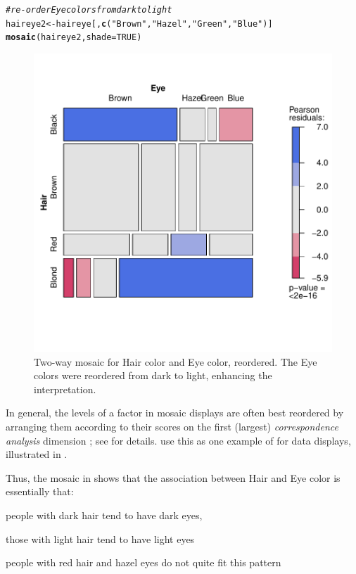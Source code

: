 \documentclass[11pt]{book}\usepackage[]{graphicx}\usepackage[]{color}
\makeatletter
\newcommand{\hlnum}[1]{\textcolor[rgb]{0.686,0.059,0.569}{#1}}%
\newcommand{\hlstr}[1]{\textcolor[rgb]{0.192,0.494,0.8}{#1}}%
\newcommand{\hlcom}[1]{\textcolor[rgb]{0.678,0.584,0.686}{\textit{#1}}}%
\newcommand{\hlstd}[1]{\textcolor[rgb]{0.345,0.345,0.345}{#1}}%
\newcommand{\hlkwb}[1]{\textcolor[rgb]{0.69,0.353,0.396}{#1}}%
\newcommand{\hlkwc}[1]{\textcolor[rgb]{0.333,0.667,0.333}{#1}}%
\newcommand{\hlkwd}[1]{\textcolor[rgb]{0.737,0.353,0.396}{\textbf{#1}}}%
\newenvironment{kframe}{%
 \def\at@end@of@kframe{}%
 \ifinner\ifhmode%
  \def\at@end@of@kframe{\end{minipage}}%
  \begin{minipage}{\columnwidth}%
 \fi\fi%
 \def\FrameCommand##1{\hskip\@totalleftmargin \hskip-\fboxsep
 \colorbox{shadecolor}{##1}\hskip-\fboxsep
     \hskip-\linewidth \hskip-\@totalleftmargin \hskip\columnwidth}%
 \MakeFramed {\advance\hsize-\width
   \@totalleftmargin\z@ \linewidth\hsize
   \@setminipage}}%
 {\par\unskip\endMakeFramed%
 \at@end@of@kframe}
\newenvironment{knitrout}{}{} %
\renewenvironment{knitrout}{\small\renewcommand{\baselinestretch}{.85}}{} %
\makeatother
\begin{document}
\begin{knitrout}
\color{fgcolor}\begin{kframe}
\begin{alltt}
\hlcom{# re-order Eye colors from dark to light}
\hlstd{haireye2} \hlkwb{<-} \hlstd{haireye[,} \hlkwd{c}\hlstd{(}\hlstr{"Brown"}\hlstd{,} \hlstr{"Hazel"}\hlstd{,} \hlstr{"Green"}\hlstd{,} \hlstr{"Blue"}\hlstd{)]}
\hlkwd{mosaic}\hlstd{(haireye2,} \hlkwc{shade}\hlstd{=}\hlnum{TRUE}\hlstd{)}
\end{alltt}
\end{kframe}\begin{figure}[htbp]


\centerline{\includegraphics[width=.6\textwidth]{ch05/fig/haireye-mos9} }

\caption[Two-way mosaic for Hair color and Eye color, reordered]{Two-way mosaic for Hair color and Eye color, reordered. The Eye colors were reordered from dark to light, enhancing the interpretation.\label{fig:haireye-mos9}}
\end{figure}


\end{knitrout}


In general, the levels of a factor in mosaic displays
are often best reordered by
arranging them according to their scores on the first (largest)
\emph{correspondence analysis} dimension \citep{Friendly:94a};
see  for details.
\citet{FriendlyKwan:02:effect} use this as one example of
 for data displays, illustrated in .

Thus, the mosaic in  shows that the association between Hair and Eye color
is essentially that: 
\begin{itemize*}
\item people with dark hair tend to have dark eyes,
\item those with light hair tend to have light eyes
\item people with red hair and hazel eyes do not quite fit this pattern
\end{itemize*}
\end{document}
